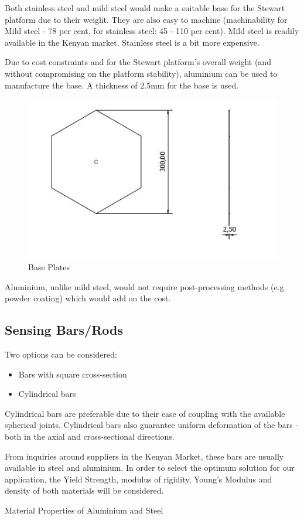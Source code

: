 Both stainless steel and mild steel would make a suitable base for the Stewart platform due to their weight. They are also easy to machine (machinability for Mild steel - 78 per cent, for stainless steel: 45 - 110 per cent). Mild steel is readily available in the Kenyan market. Stainless steel is a bit more expensive.

Due to cost constraints and for the Stewart platform's overall weight (and without compromising on the platform stability), aluminium can be used to manufacture the base. A thickness of 2.5mm for the base is used.
\begin{center}
	\begin{figure}[H]
	\centering
	\includegraphics[width=0.6\linewidth]{Figures/Base}
	\caption[Base Plates]{Base Plates}
	\end{figure}
\end{center}
Aluminium, unlike mild steel, would not require post-processing methods (e.g. powder coating) which would add on the cost.
\subsection{Sensing Bars/Rods}
Two options can be considered:
\begin{itemize}
\item Bars with square cross-section
\item Cylindrical bars
\end{itemize}
Cylindrical bars are preferable due to their ease of coupling with the available spherical joints. Cylindrical bars also guarantee uniform deformation of the bars - both in the axial and cross-sectional directions.

From inquiries around suppliers in the Kenyan Market, these bars are usually available in steel and aluminium. In order to select the optimum solution for our application, the Yield Strength, modulus of rigidity, Young's Modulus and density of both materials will be considered. 
\begin{table}[!h]
\caption[Aluminium and Steel Properties]{Material Properties of Aluminium and Steel}
\end{table}

